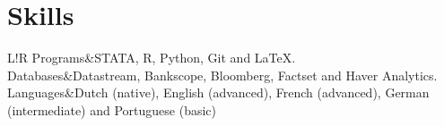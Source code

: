 \documentclass[9pt]{article}
\newcommand\VRule{\color{lightgray}\vrule width 0.5pt}
\begin{document}
\section*{Skills}
\begin{tabular}{L!{\VRule}R}
	Programs&STATA, R, Python, Git and {\LaTeX}. \\[2pt]
	Databases&Datastream, Bankscope, Bloomberg, Factset and Haver Analytics. \\[2pt]
	Languages&Dutch (native), English (advanced), French (advanced), German (intermediate) and Portuguese (basic)
\end{tabular}



 
\end{document}
